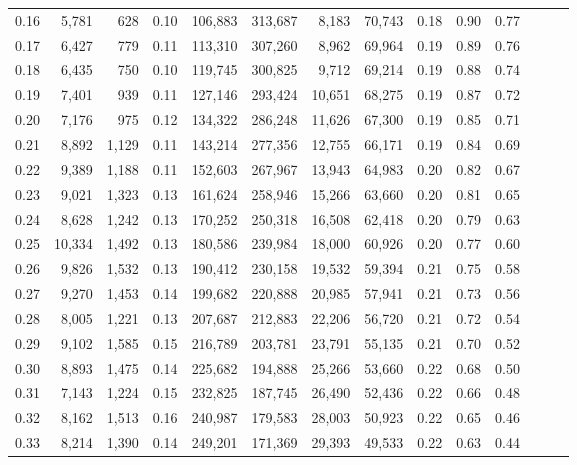 \begin{tabular}{rrrrrrrrrrrrrr}
0.16 &   5,781 &    628 &  0.10 &  106,883 &  313,687 &   8,183 &  70,743 &  0.18 &  0.90 &      0.77 \\
0.17 &   6,427 &    779 &  0.11 &  113,310 &  307,260 &   8,962 &  69,964 &  0.19 &  0.89 &      0.76 \\
0.18 &   6,435 &    750 &  0.10 &  119,745 &  300,825 &   9,712 &  69,214 &  0.19 &  0.88 &      0.74 \\
0.19 &   7,401 &    939 &  0.11 &  127,146 &  293,424 &  10,651 &  68,275 &  0.19 &  0.87 &      0.72 \\
0.20 &   7,176 &    975 &  0.12 &  134,322 &  286,248 &  11,626 &  67,300 &  0.19 &  0.85 &      0.71 \\
0.21 &   8,892 &  1,129 &  0.11 &  143,214 &  277,356 &  12,755 &  66,171 &  0.19 &  0.84 &      0.69 \\
0.22 &   9,389 &  1,188 &  0.11 &  152,603 &  267,967 &  13,943 &  64,983 &  0.20 &  0.82 &      0.67 \\
0.23 &   9,021 &  1,323 &  0.13 &  161,624 &  258,946 &  15,266 &  63,660 &  0.20 &  0.81 &      0.65 \\
0.24 &   8,628 &  1,242 &  0.13 &  170,252 &  250,318 &  16,508 &  62,418 &  0.20 &  0.79 &      0.63 \\
0.25 &  10,334 &  1,492 &  0.13 &  180,586 &  239,984 &  18,000 &  60,926 &  0.20 &  0.77 &      0.60 \\
0.26 &   9,826 &  1,532 &  0.13 &  190,412 &  230,158 &  19,532 &  59,394 &  0.21 &  0.75 &      0.58 \\
0.27 &   9,270 &  1,453 &  0.14 &  199,682 &  220,888 &  20,985 &  57,941 &  0.21 &  0.73 &      0.56 \\
0.28 &   8,005 &  1,221 &  0.13 &  207,687 &  212,883 &  22,206 &  56,720 &  0.21 &  0.72 &      0.54 \\
0.29 &   9,102 &  1,585 &  0.15 &  216,789 &  203,781 &  23,791 &  55,135 &  0.21 &  0.70 &      0.52 \\
0.30 &   8,893 &  1,475 &  0.14 &  225,682 &  194,888 &  25,266 &  53,660 &  0.22 &  0.68 &      0.50 \\
0.31 &   7,143 &  1,224 &  0.15 &  232,825 &  187,745 &  26,490 &  52,436 &  0.22 &  0.66 &      0.48 \\
0.32 &   8,162 &  1,513 &  0.16 &  240,987 &  179,583 &  28,003 &  50,923 &  0.22 &  0.65 &      0.46 \\
0.33 &   8,214 &  1,390 &  0.14 &  249,201 &  171,369 &  29,393 &  49,533 &  0.22 &  0.63 &      0.44 \\

\end{tabular}
